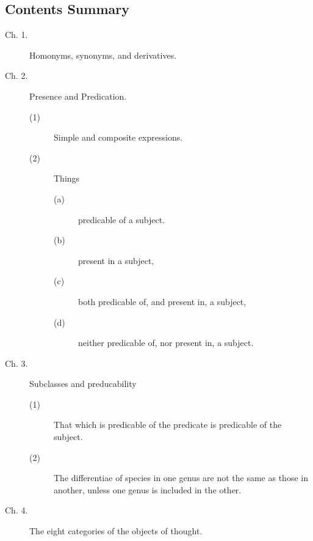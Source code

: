 
\subsection*{Contents Summary} 

\renewcommand{\aref}{\arefB}

\begin{description}
\item[Ch. 1.] Homonyms, synonyms, and derivatives. 

\item[Ch. 2.] Presence and Predication.

\begin{description}
\item[(1)] Simple and composite expressions. 
\item[(2)] Things
\begin{description}
\item[(a)] predicable of a subject.
\item[(b)] present in a subject,
\item[(c)] both predicable of, and present in, a subject,
\item[(d)] neither predicable of, nor present in, a subject.
\end{description}
\end{description}

\item[Ch. 3.] Subclasses and preducability
\begin{description}
\item[(1)] That which is predicable of the predicate is predicable of the subject. 
\item[(2)] The differentiae of species in one genus are not the same as those in another, unless one genus is included in the other. 
\end{description}

\item[Ch. 4.] The eight categories of the objects of thought. 


\end{description}
